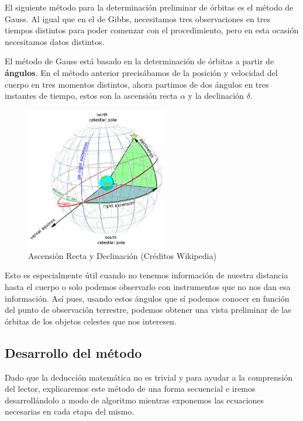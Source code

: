 \documentclass{article}
\numberwithin{equation}{section}
\begin{document}
El siguiente método para la determinación preliminar de órbitas es el método de Gauss. Al igual que en el de Gibbs, necesitamos tres observaciones en tres tiempos distintos para poder comenzar con el procedimiento, pero en esta ocasión necesitamos datos distintos.\par

El método de Gauss está basado en la determinación de órbitas a partir de \textbf{ángulos}. En el método anterior precisábamos de la posición y velocidad del cuerpo en tres momentos distintos, ahora partimos de dos ángulos en tres instantes de tiempo, estos son la ascensión recta $\alpha$ y la declinación $\delta$.\par

\begin{figure}[h]
    \centering
    \includegraphics[width=0.55\textwidth]{ARyD.png}
    \caption{Ascensión Recta y Declinación (Créditos 
    Wikipedia)}
\end{figure} 
Esto es especialmente útil cuando no tenemos información de nuestra distancia hasta el cuerpo o solo podemos observarlo con instrumentos que no nos dan esa información. Así pues, usando estos ángulos que sí podemos conocer en función del punto de observación terrestre, podemos obtener una vista preliminar de las órbitas de los objetos celestes que nos interesen.\par

\subsection{Desarrollo del método}

Dado que la deducción matemática no es trivial y para ayudar a la comprensión del lector, explicaremos este método de una forma secuencial e iremos desarrollándolo a modo de algoritmo mientras exponemos las ecuaciones necesarias en cada etapa del mismo.\par
\end{document}
